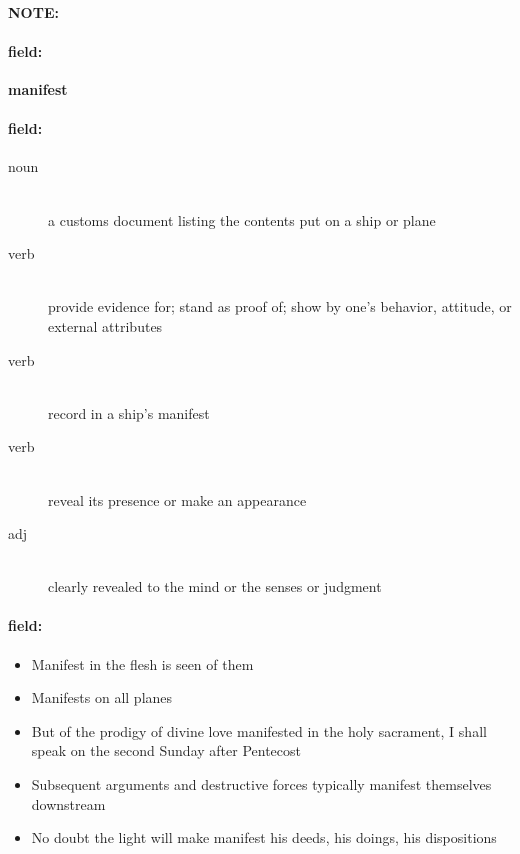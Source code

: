 \documentclass[12pt]{article}
\newenvironment{note}{\paragraph{NOTE:}}{}
\newenvironment{field}{\paragraph{field:}}{}
\begin{document}
\begin{note}
\begin{field}
\textbf{\large manifest}
\end{field}


\begin{field}
\begin{description}
\item[noun] \hfill \\ 
a customs document listing the contents put on a ship or plane

\item[verb] \hfill \\ 
provide evidence for; stand as proof of; show by one's behavior, attitude, or external attributes

\item[verb] \hfill \\ 
record in a ship's manifest

\item[verb] \hfill \\ 
reveal its presence or make an appearance

\item[adj] \hfill \\ 
clearly revealed to the mind or the senses or judgment

\end{description}
\end{field}

\begin{field}
\begin{itemize}
\item Manifest in the flesh is seen of them
\item Manifests on all planes
\item But of the prodigy of divine love manifested in the holy sacrament, I shall speak on the second Sunday after Pentecost
\item Subsequent arguments and destructive forces typically manifest themselves downstream
\item No doubt the light will make manifest his deeds, his doings, his dispositions
\end{itemize}
\end{field}
\end{note}
\end{document}
